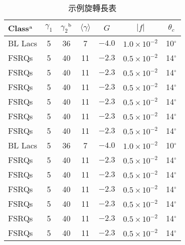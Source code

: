 \documentclass[
    添加扉页=是,
    添加原創聲明頁=是,
    添加校徽水印=是,
    奇偶页邊距對稱=不,
]{.def/must}
\begin{document}
\begin{sidewaystable}[!htp]
	\caption{示例旋轉長表} 
	\centering
	\setlength{\tabcolsep}{10mm}
	\begin{tabular}[l]{@{}lcccccc}		
	\toprule		
	Class$^{\rm a}$ & $\gamma_1$ & $\gamma_2$$^{\rm b}$& $\langle \gamma \rangle$& $G$ & $|{ f}|$ & $\theta _{c}$ \\		
	\midrule	
        BL Lacs &5 & 36 & 7 & $-4.0$ & $1.0\times 10^{-2}$ & 10$^\circ$ \\		
        FSRQs & 5 & 40 & 11 & $-2.3$ & $0.5\times 10^{-2}$ & 14$^\circ$ \\	
        FSRQs & 5 & 40 & 11 & $-2.3$ & $0.5\times 10^{-2}$ & 14$^\circ$ \\	
        FSRQs & 5 & 40 & 11 & $-2.3$ & $0.5\times 10^{-2}$ & 14$^\circ$ \\	
        FSRQs & 5 & 40 & 11 & $-2.3$ & $0.5\times 10^{-2}$ & 14$^\circ$ \\	
        FSRQs & 5 & 40 & 11 & $-2.3$ & $0.5\times 10^{-2}$ & 14$^\circ$ \\	
        FSRQs & 5 & 40 & 11 & $-2.3$ & $0.5\times 10^{-2}$ & 14$^\circ$ \\	
        BL Lacs &5 & 36 & 7 & $-4.0$ & $1.0\times 10^{-2}$ & 10$^\circ$ \\		
        FSRQs & 5 & 40 & 11 & $-2.3$ & $0.5\times 10^{-2}$ & 14$^\circ$ \\	
        FSRQs & 5 & 40 & 11 & $-2.3$ & $0.5\times 10^{-2}$ & 14$^\circ$ \\	
        FSRQs & 5 & 40 & 11 & $-2.3$ & $0.5\times 10^{-2}$ & 14$^\circ$ \\	
        FSRQs & 5 & 40 & 11 & $-2.3$ & $0.5\times 10^{-2}$ & 14$^\circ$ \\	
        FSRQs & 5 & 40 & 11 & $-2.3$ & $0.5\times 10^{-2}$ & 14$^\circ$ \\	
        FSRQs & 5 & 40 & 11 & $-2.3$ & $0.5\times 10^{-2}$ & 14$^\circ$ \\	
	\bottomrule		
\end{tabular}
\end{sidewaystable}
\end{document}
